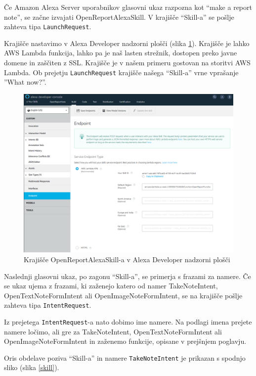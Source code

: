 \documentclass[a4paper, 12pt]{book}
\begin{document}
Če Amazon Alexa Server uporabnikov glasovni ukaz razpozna kot \enquote{make a report note}, se začne izvajati OpenReportAlexaSkill.
V krajišče \enquote{Skill-a} se pošlje zahteva tipa \texttt{LaunchRequest}.

Krajišče nastavimo v Alexa Developer nadzorni plošči (slika \ref{skill_endpoint}).
Krajišče je lahko AWS Lambda funkcija, lahko pa je naš lasten strežnik, dostopen preko javne domene in zaščiten z SSL.
Krajišče je v našem primeru gostovan na storitvi AWS Lambda.
Ob prejetju \texttt{LaunchRequest} krajišče našega \enquote{Skill-a} vrne vprašanje ''What now?''.

\begin{figure}[H]
\begin{center}
\includegraphics[width=13cm]{skill_endpoint}
\end{center}
\caption{Krajišče OpenReportAlexaSkill-a v Alexa Developer nadzorni plošči}
\label{skill_endpoint}
\end{figure}

Naslednji glasovni ukaz, po zagonu \enquote{Skill-a}, se primerja s frazami za namere.
Če se ukaz ujema z frazami, ki zaženejo katero od namer TakeNoteIntent, OpenTextNoteFormIntent ali OpenImageNoteFormIntent, se na krajišče pošlje zahteva tipa \texttt{IntentRequest}.

Iz prejetega \texttt{IntentRequest}-a nato dobimo ime namere.
Na podlagi imena prejete namere ločimo, ali gre za TakeNoteIntent, OpenTextNoteFormIntent ali OpenImageNoteFormIntent in zaženemo funkcije, opisane v prejšnjem poglavju.

Oris obdelave poziva \enquote{Skill-a} in namere \texttt{TakeNoteIntent} je prikazan s spodnjo sliko (slika \ref{skill}).
\end{document}
